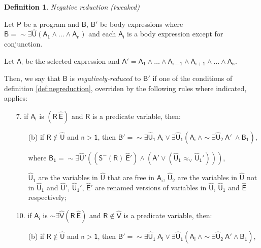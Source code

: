 \documentclass[inscr,ack,preface]{dithesis}
\theoremstyle{definition}
\newtheorem{definition}{Definition}[]
\newcommand{\msf}[1]{$\mathsf{#1}$}
\begin{document}
\begin{definition}{\emph{Negative reduction (tweaked)}}
\label{def:negreduction_new}

Let \msf{P} be a program and \msf{B}, \msf{B'} be body expressions where \msf{B = \sim \exists \widehat{U} \left( A_1 \land \dots \land A_n \right)} and each \msf{A_i} is a body expression except for conjunction.

Let \msf{A_i} be the selected expression and \msf{A' = A_1 \land \dots \land A_{i-1} \land A_{i+1} \land \dots \land A_n}.

Then, we say that \msf{B} is \emph{negatively-reduced} to \msf{B'} if one of the conditions of definition \ref{def:negreduction}, overriden by the following rules where indicated, applies:

\begin{enumerate}
  \item[7.] if \msf{A_i} is \msf{\left( R ~ \widehat{E} \right)} and \msf{R} is a predicate variable, then:
        \begin{enumerate}
          \item[(b)] if \msf{R \not \in \widehat{U}} and \msf{n > 1}, then
                \msf{B' = \sim \exists \widehat{U}_1 ~ A_i \lor \exists \widehat{U}_1 \left( A_i ~\land \sim \exists \widehat{U}_2 ~ A' ~\land B_{1} \right)},

                where \msf{B_{1} = \sim\exists \widehat{U}' \left( \left( S^{-}\left( R \right) ~\widehat{E}' \right) \land \left( A' \lor \left( \widehat{U}_{1} \approx_{\lor} \widehat{U}_{1}' \right) \right) \right)},

                \msf{\widehat{U}_1} are the variables in \msf{\widehat{U}} that are free in \msf{A_i}, \msf{\widehat{U}_2} are the variables in \msf{\widehat{U}} not in \msf{\widehat{U}_1} and \msf{\widehat{U}'}, \msf{\widehat{U}_{1}'}, \msf{\widehat{E}'} are renamed versions of variables in \msf{\widehat{U}}, \msf{\widehat{U}_{1}} and \msf{\widehat{E}} respectively;
        \end{enumerate}
  \item[10.] if \msf{A_i} is \msf{\sim \exists \widehat{V} \left( R ~ \widehat{E} \right)} and \msf{R \not\in \widehat{V}} is a predicate variable,
        then:
        \begin{enumerate}
          \item[(b)] if \msf{R \not\in \widehat{U}} and \msf{n > 1},
                then \msf{B' = \sim \exists \widehat{U}_1 ~ A_i \lor \exists \widehat{U}_1 \left( A_i ~ \land \sim \exists \widehat{U}_2 ~ A' \land B_{1} \right)},


\end{enumerate}
\end{enumerate}
\end{definition}
\end{document}
